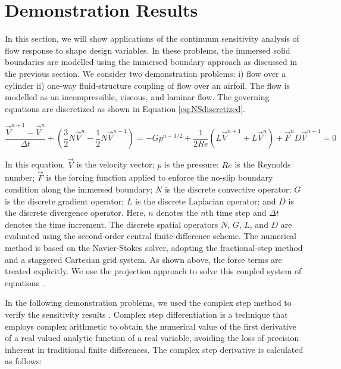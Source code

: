 \documentclass[12pt]{aiaa-pretty}
\begin{document}
\section{Demonstration Results}
In this section, we will show applications of the continuum sensitivity analysis of flow response to shape design variables. In these problems, the immersed solid boundaries are modelled using the immersed boundary approach as discussed in the previous section. We consider two demonstration problems: i) flow over a cylinder ii) one-way fluid-structure coupling of flow over an airfoil. The flow is modelled as an incompressible, viscous, and laminar flow. The governing equations are discretized as shown in Equation \eqref{eq:NSdiscretized}.

%
\begin{subequations}\label{eq:NSdiscretized}
\begin{equation}
	\frac{\vec{V}^{n+1} - \vec{V}^n}{\Delta t} + 
	\left( \frac{3}{2} N\vec{V}^n - \frac{1}{2} N\vec{V}^{n-1} \right) = 
	-G p^{n + 1/2} + 
	\frac{1}{2Re} \left( L \vec{V}^{n+1} + L \vec{V}^n \right) + 
	\vec{F}^n
\end{equation}
\begin{equation}
	D \vec{V}^{n+1} = 0
\end{equation}
\end{subequations}
%

In this equation, $\vec{V}$ is the velocity vector; $p$ is the pressure; $Re$ is the Reynolds number; $\vec{F}$ is the forcing function applied to enforce the no-slip boundary condition along the immersed boundary; $N$ is the discrete convective operator; $G$ is the discrete gradient operator; $L$ is the discrete Laplacian operator; and $D$ is the discrete divergence operator. Here, $n$ denotes the $n$th time step and $\Delta t$ denotes the time increment. The discrete spatial operators $N$, $G$, $L$, and $D$ are evaluated using the second-order central finite-difference scheme. The numerical method is based on the Navier-Stokes solver, adopting the fractional-step method and a staggered Cartesian grid system. As shown above, the force terms are treated explicitly. We use the projection approach to solve this coupled system of equations \cite{brown2001accurate}.

In the following demonstration problems, we used the complex step method to verify the sensitivity results \cite{martins2003complex}. Complex step differentiation is a technique that employs complex arithmetic to obtain the numerical value of the first derivative of a real valued analytic function of a real variable, avoiding the loss of precision inherent in traditional finite differences. The complex step derivative is calculated as follows:
\end{document}

